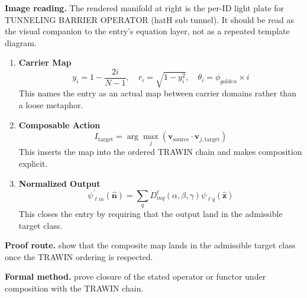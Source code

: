\begin{samepage}
\noindent\begin{minipage}[t]{0.45\linewidth}
\vspace{0pt}
\raggedright
\scriptsize\textbf{Image reading.} The rendered manifold at right is the per-ID light plate for TUNNELING BARRIER OPERATOR (hatH sub tunnel). It should be read as the visual companion to the entry's equation layer, not as a repeated template diagram.\par
\end{minipage}\hfill
\begin{minipage}[t]{0.53\linewidth}
\vspace*{-0.10in}
\raggedright
{}
\end{minipage}
\end{samepage}

\clearpage


\begin{enumerate}[leftmargin=1.6em,itemsep=9pt,topsep=6pt]
\item \textbf{Carrier Map}
\[
y_i = 1 - \frac{2i}{N-1}, \quad r_i = \sqrt{1 - y_i^2}, \quad \theta_i = \phi_{golden} \times i
\]
This names the entry as an actual map between carrier domains rather than a loose metaphor.

\item \textbf{Composable Action}
\[
I_{\mathrm{target}}
=
\arg\max_j\left(\mathbf{v}_{\mathrm{source}}\cdot\mathbf{v}_{j,\mathrm{target}}\right)
\]
This inserts the map into the ordered TRAWIN chain and makes composition explicit.

\item \textbf{Normalized Output}
\[
\psi_{\ell m}^{\prime}(\widehat{\mathbf{n}})
=
\sum_q D_{mq}^{\ell}(\alpha,\beta,\gamma)\psi_{\ell q}(\widehat{\mathbf{z}})
\]
This closes the entry by requiring that the output land in the admissible target class.
\end{enumerate}

\textbf{Proof route.} show that the composite map lands in the admissible target class once the TRAWIN ordering is respected.

\textbf{Formal method.} prove closure of the stated operator or functor under composition with the TRAWIN chain.

\medskip
{}

